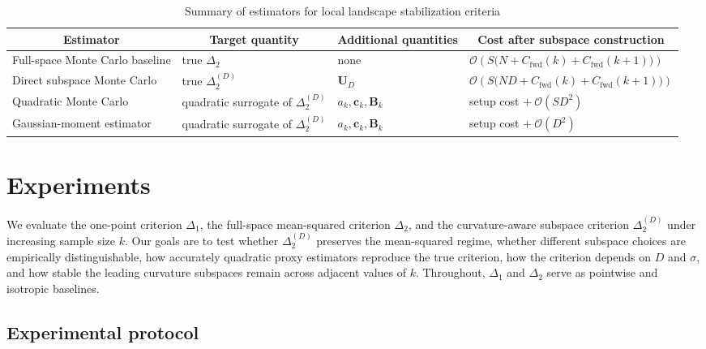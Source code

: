 \documentclass[10pt]{article}
\theoremstyle{plain}
\theoremstyle{remark}
\begin{document}
\begin{table}[t]
\caption{Summary of estimators for local landscape stabilization criteria}
\label{tab:estimator-summary}
\begin{center}
\small
\begin{tabular}{p{3.0cm} p{2.5cm} p{2.0cm} p{3.0cm}}
\toprule
\multicolumn{1}{c}{\bf Estimator} &
\multicolumn{1}{c}{\bf Target quantity} &
\multicolumn{1}{c}{\bf Additional quantities} &
\multicolumn{1}{c}{\bf Cost after subspace construction}
\\
\midrule
Full-space Monte Carlo baseline
&
true $\Delta_2$
&
none
&
$\mathcal O\!\left(S\bigl(N + C_{\mathrm{fwd}}(k)+C_{\mathrm{fwd}}(k+1)\bigr)\right)$
\\[0.5em]

Direct subspace Monte Carlo
&
true $\Delta_2^{(D)}$
&
$\mathbf U_D$
&
$\mathcal O\!\left(S\bigl(ND + C_{\mathrm{fwd}}(k)+C_{\mathrm{fwd}}(k+1)\bigr)\right)$
\\[0.5em]

Quadratic Monte Carlo
&
quadratic surrogate of $\Delta_2^{(D)}$
&
$a_k,\mathbf c_k,\mathbf B_k$
&
setup cost $+\ \mathcal O(SD^2)$
\\[0.5em]

Gaussian-moment estimator
&
quadratic surrogate of $\Delta_2^{(D)}$
&
$a_k,\mathbf c_k,\mathbf B_k$
&
setup cost $+\ \mathcal O(D^2)$
\\
\bottomrule
\end{tabular}
\end{center}
\end{table}

\section{Experiments}
\label{sec:experiments}

We evaluate the one-point criterion $\Delta_1$, the full-space mean-squared criterion $\Delta_2$, and the curvature-aware subspace criterion $\Delta_2^{(D)}$ under increasing sample size $k$.
Our goals are to test whether $\Delta_2^{(D)}$ preserves the mean-squared regime, whether different subspace choices are empirically distinguishable, how accurately quadratic proxy estimators reproduce the true criterion, how the criterion depends on $D$ and $\sigma$, and how stable the leading curvature subspaces remain across adjacent values of $k$.
Throughout, $\Delta_1$ and $\Delta_2$ serve as pointwise and isotropic baselines.

\subsection{Experimental protocol}
\label{sec:exp-protocol}
\end{document}
